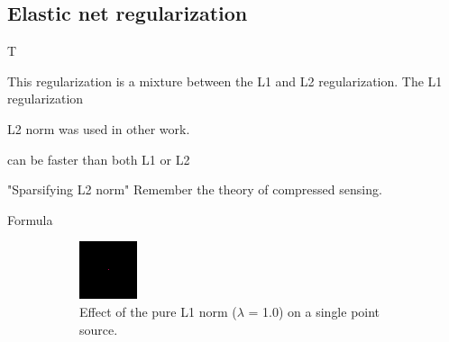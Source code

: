 \subsection{Elastic net regularization} \label{cd:reg}

T

This regularization is a mixture between the L1 and L2 regularization. The L1 regularization 



L2 norm was used in other work. \cite{ferrari2014distributed}

can be faster than both L1 or L2

"Sparsifying L2 norm"
Remember the theory of compressed sensing.

Formula

\begin{figure}[h]
	\centering
	\begin{subfigure}[b]{0.3\linewidth}
		\includegraphics[width=\linewidth]{./chapters/03.distribution/L1.png}
		\caption{Effect of the pure L1 norm ($\lambda$ = 1.0) on a single point source.}
		\label{dist:cd:elastic:L1}
	\end{subfigure}
	\begin{subfigure}[b]{0.3\linewidth}

\end{subfigure}
\end{figure}
